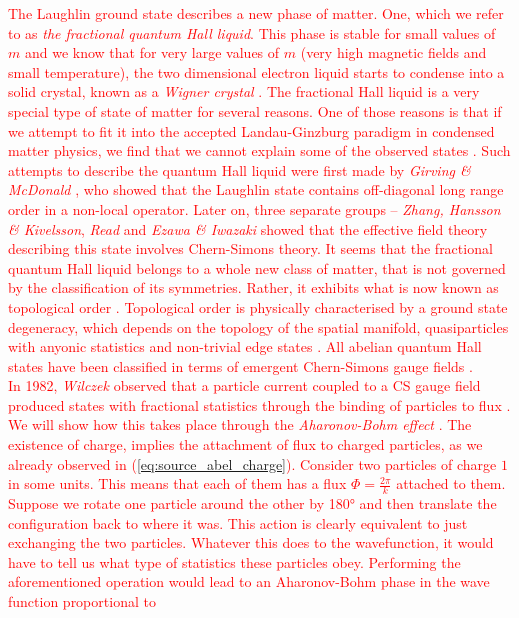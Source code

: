  \textcolor{red}{The Laughlin ground state describes a new phase of matter. One, which we refer to as \textit{the fractional quantum Hall liquid}. This phase is stable for small values of $m$ and we know that for very large values of $m$ (very high magnetic fields and small temperature), the two dimensional electron liquid starts to condense into a solid crystal, known as a \textit{Wigner crystal} \cite{PhysRevLett.60.2765, PhysRev.46.1002, Wigner1938}. The fractional Hall liquid is a very special type of state of matter for several reasons. One of those reasons is that if we attempt to fit it into the accepted Landau-Ginzburg paradigm in condensed matter physics, we find that we cannot explain some of the observed states \cite{wen2004quantum}. Such attempts to describe the quantum Hall liquid were first made by \textit{Girving \& McDonald} \cite{PhysRevLett.58.1252}, who showed that the Laughlin state contains off-diagonal long range order in a non-local operator. Later on, three separate groups --  \textit{Zhang, Hansson \& Kivelsson}, \textit{Read} and \textit{Ezawa \& Iwazaki} \cite{PhysRevLett.62.82, PhysRevB.43.2637, Read1989} showed that the effective field theory describing this state involves Chern-Simons theory. It seems that the fractional quantum Hall liquid belongs to a whole new class of matter, that is not governed by the classification of its symmetries. Rather, it exhibits what is now known as topological order \cite{Wen:1995qn, TopOrderRigidStates}. Topological order is physically characteri\textcolor{red}{s}ed by a ground state degeneracy, which depends on the topology of the spatial manifold, quasiparticles with anyonic statistics and non-trivial edge states \cite{Wen:1995qn}. All abelian quantum Hall states have been classified in terms of emergent Chern-Simons gauge fields \cite{PhysRevB.46.2290}.}\\
\indent \textcolor{red}{In 1982, \textit{Wilczek} observed that a particle current coupled to a CS gauge field produced states with fractional statistics through the binding of particles to flux \cite{Wilczek:1981du}. We will show how this takes place through the \textit{Aharonov-Bohm effect} \cite{Aharonov:1959fk, PhysRevLett.5.3}. The existence of charge, implies the attachment of flux to charged particles, as we already observed in (\ref{eq:source_abel_charge}). Consider two particles of charge $1$ in some units. This means that each of them has a flux $\Phi = \frac{2\pi}{k}$ attached to them. Suppose we rotate one particle around the other by 180° and then translate the configuration back to where it was. This action is clearly equivalent to just exchanging the two particles. Whatever this does to the wavefunction, it would have to tell us what type of statistics these particles obey. Performing the aforementioned operation would lead to an Aharonov-Bohm phase in the wave function proportional to}

